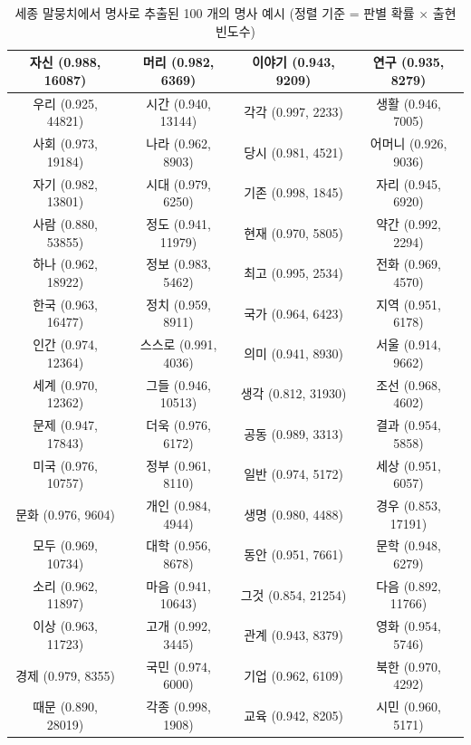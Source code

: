 \documentclass[11pt]{article}
\begin{document}
\begin{table}[H]
\small
\centering
\caption{세종 말뭉치에서 명사로 추출된 100 개의 명사 예시 (정렬 기준 = 판별 확률 $\times$ 출현 빈도수)}
\label{tab:sejong_frequent_top100}
\begin{tabular}{|c|c|c|c|}
\hline
자신 (0.988, 16087)  & 머리 (0.982, 6369)  & 이야기 (0.943, 9209) & 연구 (0.935, 8279)  \\ \hline
우리 (0.925, 44821)  & 시간 (0.940, 13144) & 각각 (0.997, 2233)  & 생활 (0.946, 7005)  \\ \hline
사회 (0.973, 19184)  & 나라 (0.962, 8903)  & 당시 (0.981, 4521)  & 어머니 (0.926, 9036) \\ \hline
자기 (0.982, 13801)  & 시대 (0.979, 6250)  & 기존 (0.998, 1845)  & 자리 (0.945, 6920)  \\ \hline
사람 (0.880, 53855)  & 정도 (0.941, 11979) & 현재 (0.970, 5805)  & 약간 (0.992, 2294)  \\ \hline
하나 (0.962, 18922)  & 정보 (0.983, 5462)  & 최고 (0.995, 2534)  & 전화 (0.969, 4570)  \\ \hline
한국 (0.963, 16477)  & 정치 (0.959, 8911)  & 국가 (0.964, 6423)  & 지역 (0.951, 6178)  \\ \hline
인간 (0.974, 12364)  & 스스로 (0.991, 4036) & 의미 (0.941, 8930)  & 서울 (0.914, 9662)  \\ \hline
세계 (0.970, 12362)  & 그들 (0.946, 10513) & 생각 (0.812, 31930) & 조선 (0.968, 4602)  \\ \hline
문제 (0.947, 17843)  & 더욱 (0.976, 6172)  & 공동 (0.989, 3313)  & 결과 (0.954, 5858)  \\ \hline
미국 (0.976, 10757)  & 정부 (0.961, 8110)  & 일반 (0.974, 5172)  & 세상 (0.951, 6057)  \\ \hline
문화 (0.976, 9604)   & 개인 (0.984, 4944)  & 생명 (0.980, 4488)  & 경우 (0.853, 17191) \\ \hline
모두 (0.969, 10734)  & 대학 (0.956, 8678)  & 동안 (0.951, 7661)  & 문학 (0.948, 6279)  \\ \hline
소리 (0.962, 11897)  & 마음 (0.941, 10643) & 그것 (0.854, 21254) & 다음 (0.892, 11766) \\ \hline
이상 (0.963, 11723)  & 고개 (0.992, 3445)  & 관계 (0.943, 8379)  & 영화 (0.954, 5746)  \\ \hline
경제 (0.979, 8355)   & 국민 (0.974, 6000)  & 기업 (0.962, 6109)  & 북한 (0.970, 4292)  \\ \hline
때문 (0.890, 28019)  & 각종 (0.998, 1908)  & 교육 (0.942, 8205)  & 시민 (0.960, 5171)  \\ \hline

\end{tabular}
\end{table}
\end{document}
